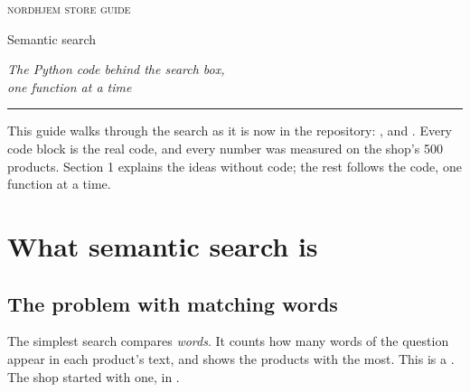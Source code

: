 \documentclass[11pt]{article}
\begin{document}
\thispagestyle{empty}
\setlength{\parindent}{0pt}
\vspace*{1.2cm}
{\color{muted}\scshape\MakeLowercase{Nordhjem store}
  \textperiodcentered{} \MakeLowercase{Guide}}\par
\vspace{0.9cm}
{\fontsize{28}{32}\selectfont Semantic search\par}
\vspace{0.5cm}
{\large\itshape\color{muted} The Python code behind the search box,\\
  one function at a time\par}
\vspace{0.6cm}
{\color{accent}\rule{2.2cm}{1.2pt}}\par
\vspace{0.6cm}
\begin{minipage}{11.5cm}
\small\color{muted}
This guide walks through the search as it is now in the repository:
,  and
. Every code block is the real code, and every
number was measured on the shop's 500 products. Section 1 explains
the ideas without code; the rest follows the code, one function at a
time.
\end{minipage}
\vspace{1.0cm}

{\small
\renewcommand{\contentsname}{\normalsize\scshape\color{muted}
  \MakeLowercase{Contents}}
\tableofcontents}

\newpage
\setlength{\parindent}{1.2em}

\section{What semantic search is}
\label{sec:ideas}

\subsection{The problem with matching words}

The simplest search compares \emph{words}. It counts how many words of
the question appear in each product's text, and shows the products
with the most. This is a . The shop started with one,
in .
\end{document}
